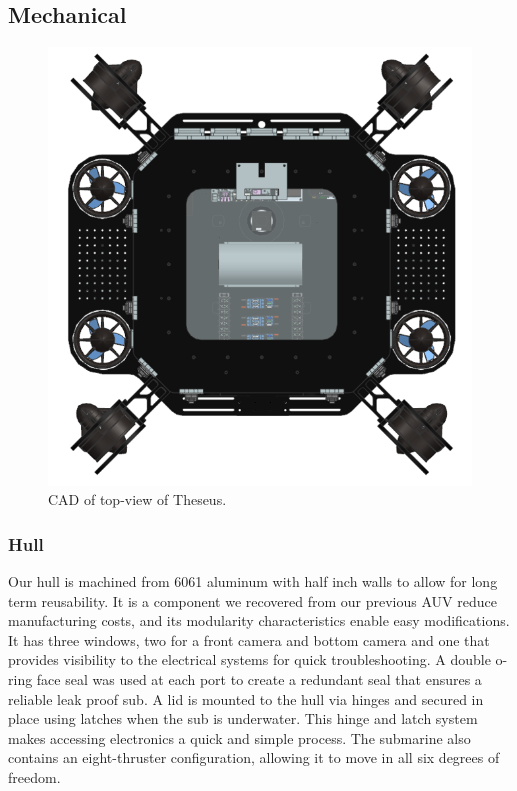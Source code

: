 \documentclass[conference]{IEEEtran}
\begin{document}
\subsection{Mechanical}
\label{ssec:mechanical}

\begin{figure}[h]
    \centerline{\includegraphics[scale=0.35]{images/FullSub2025Top.png}}
    \caption{CAD of top-view of Theseus.}
    \label{fig:sub3}
\end{figure}

\subsubsection{Hull}
\label{sssec:hull}
Our hull is machined from 6061 aluminum with half inch walls to allow for long term reusability. It is a component we recovered from our previous AUV reduce manufacturing costs, and its modularity characteristics enable easy modifications. It has three windows, two for a front camera and bottom camera and one that provides visibility to the electrical systems for quick troubleshooting. A double o-ring face seal was used at each port to create a redundant seal that ensures a reliable leak proof sub. A lid is mounted to the hull via hinges and secured in place using latches when the sub is underwater. This hinge and latch system makes accessing electronics a quick and simple process. The submarine also contains an eight-thruster configuration, allowing it to move in all six degrees of freedom.
\end{document}

